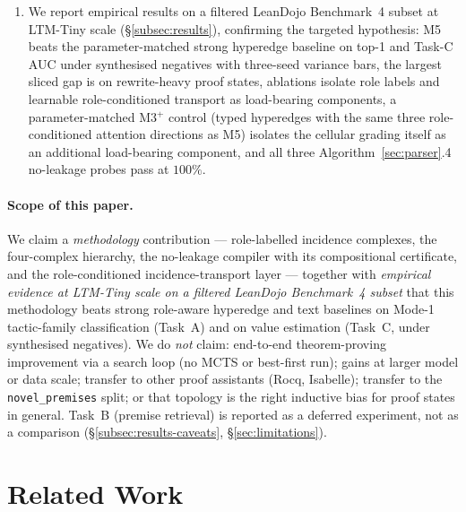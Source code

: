 \documentclass[11pt]{article}
\theoremstyle{definition}
\theoremstyle{plain}
\begin{document}
\begin{enumerate}
\item We report empirical results on a filtered LeanDojo Benchmark~4 subset at LTM-Tiny scale (\S\ref{subsec:results}), confirming the targeted hypothesis: M5 beats the parameter-matched strong hyperedge baseline on top-1 and Task-C AUC under synthesised negatives with three-seed variance bars, the largest sliced gap is on rewrite-heavy proof states, ablations isolate role labels and learnable role-conditioned transport as load-bearing components, a parameter-matched M3$^{+}$ control (typed hyperedges with the same three role-conditioned attention directions as M5) isolates the cellular grading itself as an additional load-bearing component, and all three Algorithm~\ref{sec:parser}.4 no-leakage probes pass at $100\%$.
\end{enumerate}

\paragraph{Scope of this paper.} We claim a \emph{methodology} contribution
— role-labelled incidence complexes, the four-complex hierarchy, the
no-leakage compiler with its compositional certificate, and the
role-conditioned incidence-transport layer — together with \emph{empirical
evidence at LTM-Tiny scale on a filtered LeanDojo Benchmark~4 subset} that
this methodology beats strong role-aware hyperedge and text baselines on
Mode-1 tactic-family classification (Task~A) and on value estimation
(Task~C, under synthesised negatives). We do \emph{not} claim: end-to-end
theorem-proving improvement via a search loop (no MCTS or best-first run);
gains at larger model or data scale; transfer to other proof assistants
(Rocq, Isabelle); transfer to the \texttt{novel\_premises} split; or that
topology is the right inductive bias for proof states in general. Task~B
(premise retrieval) is reported as a deferred experiment, not as a
comparison (\S\ref{subsec:results-caveats}, \S\ref{sec:limitations}).

\section{Related Work}\label{sec:related}
\end{document}
